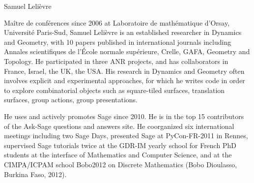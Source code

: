 \begin{participant}[type=R,PM=6]{Samuel Lelièvre}

Maître de conférences since 2006 at
Laboratoire de mathématique d'Orsay, Université Paris-Sud,
Samuel Lelièvre is an established researcher in Dynamics and Geometry,
with 10 papers published in international journals including
Annales scientifiques de l'École normale supérieure,
Crelle, GAFA, Geometry and Topology.
He participated in three ANR projects, and has collaborators
in France, Israel, the UK, the USA.
His research in Dynamics and Geometry
often involves explicit and experimental approaches,
for which he writes code in order to explore
combinatorial objects such as square-tiled surfaces,
translation surfaces, group actions, group presentations.

He uses and actively promotes Sage since 2010.
He is in the top 15 contributors of the Ask-Sage
questions and answers site.
He coorganized six international meetings including two Sage Days,
presented Sage at PyCon-FR-2011 in Rennes,
supervised Sage tutorials twice at the GDR-IM yearly school
for French PhD students at the interface of Mathematics and
Computer Science, and at the CIMPA/ICPAM school Bobo2012
on Discrete Mathematics (Bobo Dioulasso, Burkina Faso, 2012).
\end{participant}
